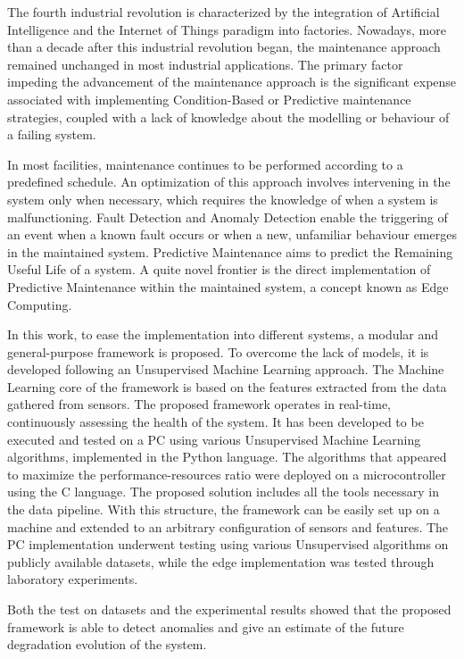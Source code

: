 The fourth industrial revolution is characterized by the integration of Artificial Intelligence and the Internet of Things paradigm into factories. Nowadays, more than a decade after this industrial revolution began, the maintenance approach remained unchanged in most industrial applications. The primary factor impeding the advancement of the maintenance approach is the significant expense associated with implementing Condition-Based or Predictive maintenance strategies, coupled with a lack of knowledge about the modelling or behaviour of a failing system.

In most facilities, maintenance continues to be performed according to a predefined schedule. An optimization of this approach involves intervening in the system only when necessary, which requires the knowledge of when a system is malfunctioning. Fault Detection and Anomaly Detection enable the triggering of an event when a known fault occurs or when a new, unfamiliar behaviour emerges in the maintained system. Predictive Maintenance aims to predict the Remaining Useful Life of a system. A quite novel frontier is the direct implementation of Predictive Maintenance within the maintained system, a concept known as Edge Computing.

In this work, to ease the implementation into different systems, a modular and general-purpose framework is proposed. To overcome the lack of models, it is developed following an Unsupervised Machine Learning approach. The Machine Learning core of the framework is based on the features extracted from the data gathered from sensors. The proposed framework operates in real-time, continuously assessing the health of the system. It has been developed to be executed and tested on a PC using various Unsupervised Machine Learning algorithms, implemented in the Python language. The algorithms that appeared to maximize the performance-resources ratio were deployed on a microcontroller using the C language. The proposed solution includes all the tools necessary in the data pipeline. With this structure, the framework can be easily set up on a machine and extended to an arbitrary configuration of sensors and features. The PC implementation underwent testing using various Unsupervised algorithms on publicly available datasets, while the edge implementation was tested through laboratory experiments.

Both the test on datasets and the experimental results showed that the proposed framework is able to detect anomalies and give an estimate of the future degradation evolution of the system. 